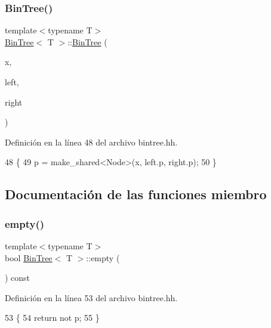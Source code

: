 \subsubsection{\texorpdfstring{Bin\+Tree()}{BinTree()}\hspace{0.1cm}{\footnotesize\ttfamily [3/3]}}
{\footnotesize\ttfamily template$<$typename T$>$ \\
\hyperlink{class_bin_tree}{Bin\+Tree}$<$ T $>$\+::\hyperlink{class_bin_tree}{Bin\+Tree} (\begin{DoxyParamCaption}\item[{const T \&}]{x,  }\item[{const \hyperlink{class_bin_tree}{Bin\+Tree}$<$ T $>$ \&}]{left,  }\item[{const \hyperlink{class_bin_tree}{Bin\+Tree}$<$ T $>$ \&}]{right }\end{DoxyParamCaption})}



Definición en la línea 48 del archivo bintree.\+hh.


\begin{DoxyCode}
48                                                                     \{
49         p = make\_shared<Node>(x, left.p, right.p);
50     \}
\end{DoxyCode}


\subsection{Documentación de las funciones miembro}
\mbox{\label{class_bin_tree_a74cda259ba5c25b8ee38ed4dc33e4fad}} 
\subsubsection{\texorpdfstring{empty()}{empty()}}
{\footnotesize\ttfamily template$<$typename T$>$ \\
bool \hyperlink{class_bin_tree}{Bin\+Tree}$<$ T $>$\+::empty (\begin{DoxyParamCaption}{ }\end{DoxyParamCaption}) const}



Definición en la línea 53 del archivo bintree.\+hh.


\begin{DoxyCode}
53                         \{
54         \textcolor{keywordflow}{return} not p;
55     \}
\end{DoxyCode}
\mbox{\label{class_bin_tree_a82108db4c1b08d1f111027788c196d4e}} 
